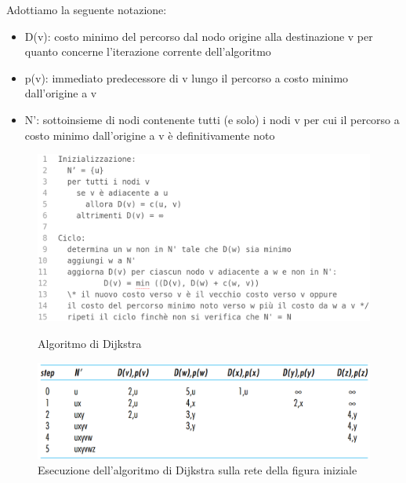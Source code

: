 \documentclass[11pt,a4paper]{article}
\begin{document}
Adottiamo la seguente notazione:
\begin{itemize}
	\item D(v): costo minimo del percorso dal nodo origine alla destinazione v per quanto concerne l'iterazione corrente dell'algoritmo
	\item p(v): immediato predecessore di v lungo il percorso a costo minimo dall'origine a v
	\item N': sottoinsieme di nodi contenente tutti (e solo) i nodi v per cui il percorso a costo minimo dall'origine a v è definitivamente noto
\end{itemize}
\begin{figure}
	\includegraphics[scale=0.4]{img/060.png}
	\caption{Algoritmo di Dijkstra}
	\includegraphics[scale=0.45]{img/061.png}
	\caption{Esecuzione dell'algoritmo di Dijkstra sulla rete della figura iniziale}
\end{figure}
\end{document}
